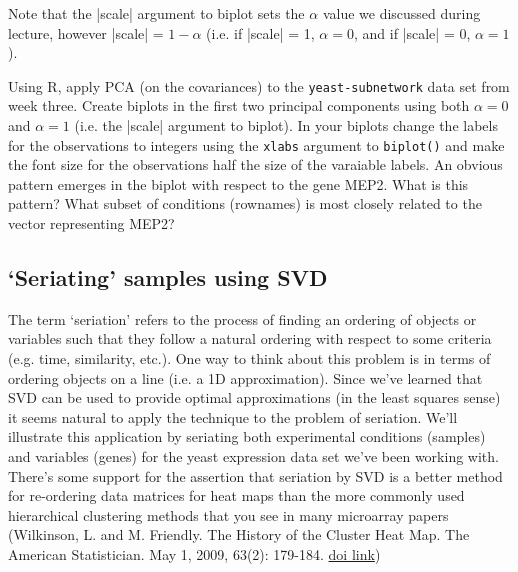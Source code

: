 Note that the |scale| argument to biplot sets the $\alpha$ value we discussed during lecture, however |scale| = $1-\alpha$ (i.e. if |scale| = 1, $\alpha=0$, and if |scale| = 0, $\alpha=1$).

\medskip
\begin{assignment}
Using R, apply PCA (on the covariances) to the \verb|yeast-subnetwork| data set from week three. Create biplots in the first two principal components using both $\alpha=0$ and $\alpha=1$ (i.e. the |scale| argument to biplot). In your biplots change the labels for the observations to integers using the \verb|xlabs| argument to \verb|biplot()| and make the font size for the observations half the size of the varaiable labels.  An obvious pattern emerges in the biplot with respect to the gene MEP2. What is this pattern? What subset of conditions (rownames) is most closely related to the vector representing MEP2?
\end{assignment}



\subsection{`Seriating' samples using SVD}

The term `seriation' refers to the process of finding an ordering of objects or variables such that they follow a natural ordering with respect to some criteria (e.g. time, similarity, etc.). One way to think about this problem is in terms of ordering objects on a line (i.e. a 1D approximation).  Since we've learned that SVD can be used to provide optimal approximations (in the least squares sense) it seems natural to apply the technique to the problem of seriation. We'll illustrate this application by seriating both experimental conditions (samples) and variables (genes) for the yeast expression data set we've been working with.  There's some support for the assertion that seriation by SVD is a better method for re-ordering data matrices for heat maps than the more commonly used hierarchical clustering methods that you see in many microarray papers (Wilkinson, L. and M. Friendly. The History of the Cluster Heat Map. The American Statistician. May 1, 2009, 63(2): 179-184. \href{http://dx.doi.org/10.1198/tas.2009.0033}{doi link}) 



